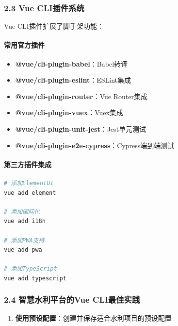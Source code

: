 \subsubsection{2.3 Vue
CLI插件系统}\label{vue-cliux63d2ux4ef6ux7cfbux7edf}

Vue CLI插件扩展了脚手架功能：

\paragraph{常用官方插件}\label{ux5e38ux7528ux5b98ux65b9ux63d2ux4ef6}

\begin{itemize}
\tightlist
\item
  \textbf{@vue/cli-plugin-babel}：Babel转译
\item
  \textbf{@vue/cli-plugin-eslint}：ESLint集成
\item
  \textbf{@vue/cli-plugin-router}：Vue Router集成
\item
  \textbf{@vue/cli-plugin-vuex}：Vuex集成
\item
  \textbf{@vue/cli-plugin-unit-jest}：Jest单元测试
\item
  \textbf{@vue/cli-plugin-e2e-cypress}：Cypress端到端测试
\end{itemize}

\paragraph{第三方插件集成}\label{ux7b2cux4e09ux65b9ux63d2ux4ef6ux96c6ux6210}

\begin{lstlisting}[language=bash]
# 添加ElementUI
vue add element

# 添加国际化
vue add i18n

# 添加PWA支持
vue add pwa

# 添加TypeScript
vue add typescript
\end{lstlisting}

\subsubsection{2.4 智慧水利平台的Vue
CLI最佳实践}\label{ux667aux6167ux6c34ux5229ux5e73ux53f0ux7684vue-cliux6700ux4f73ux5b9eux8df5}

\begin{enumerate}
\def\labelenumi{\arabic{enumi}.}
\tightlist
\item
  \textbf{使用预设配置}：创建并保存适合水利项目的预设配置
\end{enumerate}

